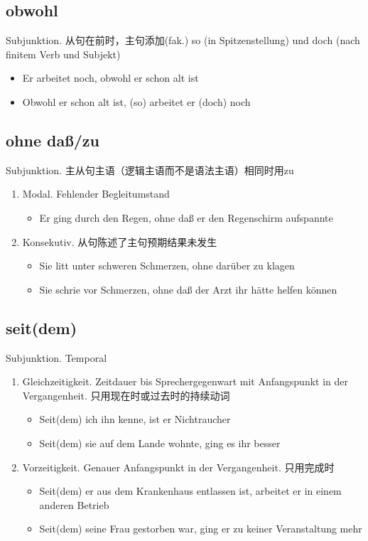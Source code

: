 \documentclass[UTF8]{report}
\begin{document}
\subsection{obwohl}
Subjunktion. 从句在前时，主句添加(fak.) so (in Spitzenstellung) und doch (nach finitem Verb und Subjekt) 

\begin{itemize}
    \item Er arbeitet noch, obwohl er schon alt ist
    \item Obwohl er schon alt ist, (so) arbeitet er (doch) noch
\end{itemize}


\subsection{ohne daß/zu}
Subjunktion. 主从句主语（逻辑主语而不是语法主语）相同时用zu
\begin{enumerate}
    \item Modal. Fehlender Begleitumstand
    \begin{itemize}
        \item Er ging durch den Regen, ohne daß er den Regenschirm aufspannte
    \end{itemize}
    \item Konsekutiv. 从句陈述了主句预期结果未发生
    \begin{itemize}
        \item Sie litt unter schweren Schmerzen, ohne darüber zu klagen
        \item Sie schrie vor Schmerzen, ohne daß der Arzt ihr hätte helfen können
    \end{itemize}
\end{enumerate}

\subsection{seit(dem)}
Subjunktion. Temporal
\begin{enumerate}
    \item Gleichzeitigkeit. Zeitdauer bis Sprechergegenwart mit Anfangspunkt in der Vergangenheit. 只用现在时或过去时的持续动词
    \begin{itemize}
        \item Seit(dem) ich ihn kenne, ist er Nichtraucher
        \item Seit(dem) sie auf dem Lande wohnte, ging es ihr besser
    \end{itemize}
    \item Vorzeitigkeit. Genauer Anfangspunkt in der Vergangenheit. 只用完成时
    \begin{itemize}
        \item Seit(dem) er aus dem Krankenhaus entlassen ist, arbeitet er in einem anderen Betrieb
        \item Seit(dem) seine Frau gestorben war, ging er zu keiner Veranstaltung mehr
    \end{itemize}
\end{enumerate}
\end{document}
